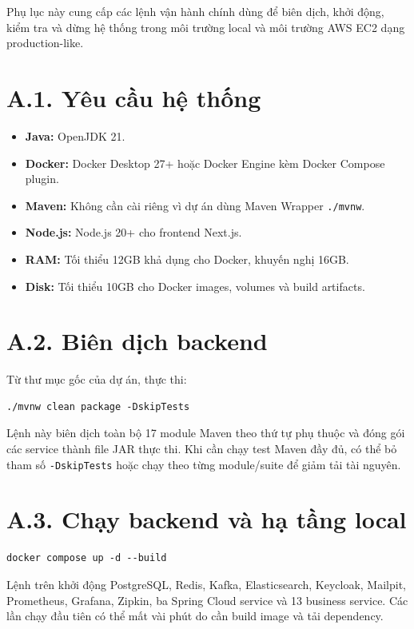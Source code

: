 \documentclass[../DoAn.tex]{subfiles}
\begin{document}
Phụ lục này cung cấp các lệnh vận hành chính dùng để biên dịch, khởi động, kiểm tra và dừng
hệ thống trong môi trường local và môi trường AWS EC2 dạng production-like.

\section*{A.1. Yêu cầu hệ thống}

\begin{itemize}
    \item \textbf{Java:} OpenJDK 21.
    \item \textbf{Docker:} Docker Desktop 27+ hoặc Docker Engine kèm Docker Compose plugin.
    \item \textbf{Maven:} Không cần cài riêng vì dự án dùng Maven Wrapper \texttt{./mvnw}.
    \item \textbf{Node.js:} Node.js 20+ cho frontend Next.js.
    \item \textbf{RAM:} Tối thiểu 12GB khả dụng cho Docker, khuyến nghị 16GB.
    \item \textbf{Disk:} Tối thiểu 10GB cho Docker images, volumes và build artifacts.
\end{itemize}

\section*{A.2. Biên dịch backend}

Từ thư mục gốc của dự án, thực thi:

\begin{verbatim}
./mvnw clean package -DskipTests
\end{verbatim}

Lệnh này biên dịch toàn bộ 17 module Maven theo thứ tự phụ thuộc và đóng gói các service
thành file JAR thực thi. Khi cần chạy test Maven đầy đủ, có thể bỏ tham số
\texttt{-DskipTests} hoặc chạy theo từng module/suite để giảm tải tài nguyên.

\section*{A.3. Chạy backend và hạ tầng local}

\begin{verbatim}
docker compose up -d --build
\end{verbatim}

Lệnh trên khởi động PostgreSQL, Redis, Kafka, Elasticsearch, Keycloak, Mailpit, Prometheus,
Grafana, Zipkin, ba Spring Cloud service và 13 business service. Các lần chạy đầu tiên có
thể mất vài phút do cần build image và tải dependency.
\end{document}
